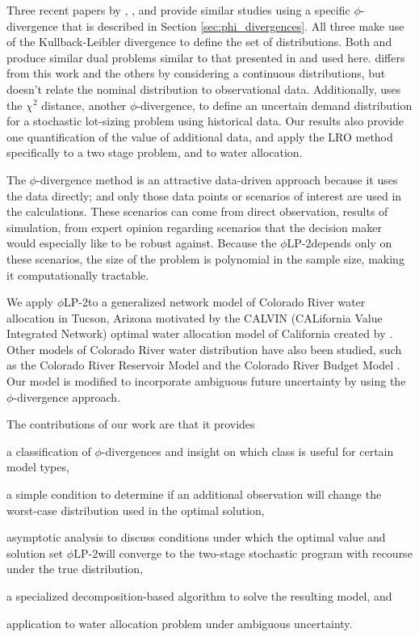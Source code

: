 \documentclass[ijoc,letterpaper]{informs3} %
\newcommand{\plp}{$\phi$LP-2}
\begin{document}
Three recent papers by \cite{wang2010likelihood}, \cite{calafiore2007ambiguous}, and \cite{hukullback} provide similar studies using a specific $\phi$-divergence that is described in Section \ref{sec:phi_divergences}.
All three make use of the Kullback-Leibler divergence to define the set of distributions.
Both \cite{wang2010likelihood} and \cite{hukullback} produce similar dual problems similar to that presented in \cite{bental2011robust} and used here.
\cite{hukullback} differs from this work and the others by considering a continuous distributions, but doesn't relate the nominal distribution to observational data.
Additionally, \cite{klabjan2013robust} uses the $\chi^2$ distance, another $\phi$-divergence, to define an uncertain demand distribution for a stochastic lot-sizing problem using historical data.
Our results also provide one quantification of the value of additional data, and apply the LRO method specifically to a two stage problem, and to water allocation.

The $\phi$-divergence method is an attractive data-driven approach because it uses the data directly; and only those data points or scenarios of interest are used in the calculations.
These scenarios can come from direct observation, results of simulation, from expert opinion regarding scenarios that the decision maker would especially like to be robust against.
Because the \plp depends only on these scenarios, the size of the problem is polynomial in the sample size, making it computationally tractable.

We apply \plp to a generalized network model of Colorado River water allocation in Tucson, Arizona motivated by the CALVIN (CALifornia Value Integrated Network) optimal water allocation model of California created by \cite{draper_etal_03}.
Other models of Colorado River water distribution have also been studied, such as the Colorado River Reservoir Model \cite{christensen2004effects} and the Colorado River Budget Model \cite{barnett2009sustainable}.
Our model is modified to incorporate ambiguous future uncertainty by using the $\phi$-divergence approach.

The contributions of our work are that it provides
\begin{inparaenum}
	\item a classification of $\phi$-divergences and insight on which class is useful for certain model types,
	\item a simple condition to determine if an additional observation will change the worst-case distribution used in the optimal solution, 
	\item asymptotic analysis to discuss conditions under which the optimal value and solution set \plp will converge to the two-stage stochastic program with recourse under the true distribution, 
	\item a specialized decomposition-based algorithm to solve the resulting model,  and 
	\item application to water allocation problem under ambiguous uncertainty. 
\end{inparaenum}
\end{document}
